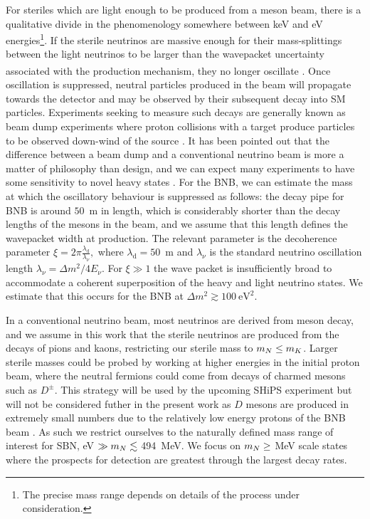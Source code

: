 \documentclass[11pt, a4paper]{article}
\def\ster{\ensuremath N}
\newcounter{CommentCount}
\newcommand{\marcom}[2]{\textsuperscript{\textcolor{#1}{\theCommentCount}}\marginpar{\textsuperscript{\textcolor{#1}{\theCommentCount}}\textcolor{#1}{{\small#1: #2}}}\stepcounter{CommentCount}}
\begin{document}
For steriles which are light enough to be produced from a meson beam, there is
a qualitative divide in the phenomenology somewhere between keV and eV
energies\footnote{The precise mass range depends on details of the process
under consideration.}. If the sterile neutrinos are massive enough for their
mass-splittings between the light neutrinos to be larger than the wavepacket
uncertainty associated with the production mechanism, they no longer oscillate
\cite{Akhmedov:2009rb}\marcom{PB}{Is this an accurate description?}.  
%
Once oscillation is suppressed, neutral particles produced in the beam will
propagate towards the detector and may be observed by their subsequent decay
into SM particles. Experiments seeking to measure such decays are generally
known as beam dump experiments where proton collisions with a target produce
particles to be observed down-wind of the source \cite{CooperSarkar:1985nh,
Bergsma:1985is, Vaitaitis:1999wq, Bernardi:1985ny, Bernardi:1987ek,
Anelli:2015pba, Alekhin:2015byh}. It has been pointed out that the difference
between a beam dump and a conventional neutrino beam is more a matter of
philosophy than design, and we can expect many experiments to have some
sensitivity to novel heavy states \cite{Gorbunov:2007ak, Asaka:2012bb,
Adams:2013qkq}. 
%
For the BNB, we can estimate the mass at which the oscillatory behaviour is
suppressed as follows: the decay pipe for BNB is around $50$~m in length, which
is considerably shorter than the decay lengths of the mesons in the beam, and
we assume that this length defines the wavepacket width at production.  The
relevant parameter is the decoherence parameter \cite{Akhmedov:2009rb,
Hernandez:2011rs}
%
$\xi = 2\pi \frac{\lambda_\text{d}}{\lambda_\nu},$
%
where $\lambda_\text{d} = 50$~m and $\lambda_\nu$ is the standard neutrino
oscillation length $\lambda_\nu = \Delta m^2/4E_\nu$. For $\xi\gg1$ the wave
packet is insufficiently broad to accommodate a coherent superposition of the
heavy and light neutrino states. We estimate that this occurs for the BNB at 
%
$ \Delta m^2 \gtrsim 100~\text{eV}^2.$
%

In a conventional neutrino beam, most neutrinos are derived from meson decay,
and we assume in this work that the sterile neutrinos are produced from the
decays of pions and kaons, restricting our sterile mass to $m_\ster \le m_K$.
%
Larger sterile masses could be probed by working at higher energies in the
initial proton beam, where the neutral fermions could come from decays of
charmed mesons such as $D^\pm$. This strategy will be used by the upcoming
SHiPS experiment \cite{Alekhin:2015byh, Anelli:2015pba} but will not be
considered futher in the present work as $D$ mesons are produced in extremely
small numbers due to the relatively low energy protons of the BNB beam
\cite{AguilarArevalo:2008yp}. As such we restrict ourselves to the naturally
defined mass range of interest for SBN, eV $\gg m_\ster \lesssim$ 494~MeV.  We
focus on $m_\ster \geq$ MeV scale states where the prospects for detection are
greatest through the largest decay rates.
\end{document}
